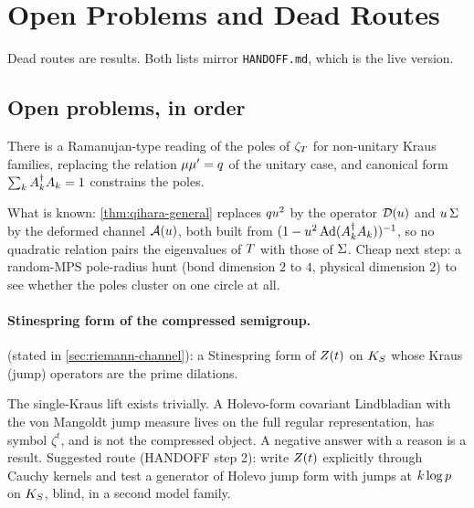 
\section{Open Problems and Dead Routes}
\label{sec:open}

Dead routes are results. Both lists mirror \texttt{HANDOFF.md}, which is
the live version.

\subsection{Open problems, in order}

\begin{conjecture}
\label{conj:kraus-ramanujan}
There is a Ramanujan-type reading of the poles of $\zeta_{T}$ for non-unitary
Kraus families, replacing the relation $\mu\mu' = q$ of the unitary case,
and canonical form $\sum_k A_{k}^\dagger A_{k} = 1$ constrains the poles.
\end{conjecture}

What is known: \cref{thm:qihara-general} replaces $qu^2$ by the
operator $\mathcal D(u)$ and $u\,\Sigma$ by the deformed channel $\mathcal A(u)$, both
built from $(1-u^2\operatorname{Ad}(A_{k}^\dagger A_{k}))^{-1}$, so no quadratic relation pairs
the eigenvalues of $T$ with those of $\Sigma$. Cheap next step: a random-MPS
pole-radius hunt (bond dimension $2$ to $4$, physical dimension $2$) to see
whether the poles cluster on one circle at all.

\paragraph{Stinespring form of the compressed semigroup.} 
(stated in \cref{sec:riemann-channel}): a Stinespring form of $Z(t)$ on $K_S$ whose Kraus
(jump) operators are the prime dilations.

The single-Kraus lift exists trivially. A Holevo-form covariant Lindbladian
with the von Mangoldt jump measure lives on the full regular representation,
has symbol $\zeta^t$, and is not the compressed object. A negative answer with
a reason is a result. Suggested route (HANDOFF step 2): write $Z(t)$ explicitly
through Cauchy kernels and test a generator of Holevo jump form with jumps at
$k\log p$ on $K_S$, blind, in a second model family.

